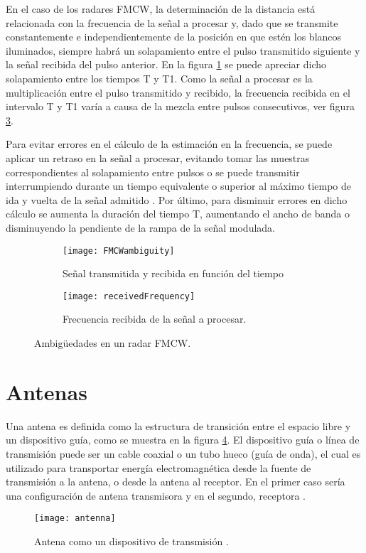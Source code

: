 En el caso de los radares FMCW, la determinación de la distancia está relacionada con la frecuencia de la señal a procesar y, dado que se transmite constantemente e independientemente de la posición en que estén los blancos iluminados, siempre habrá un solapamiento entre el pulso transmitido siguiente y la señal recibida del pulso anterior. En la figura \ref{fig:fmcwAmbiguity} se puede apreciar dicho solapamiento entre los tiempos T y T1. Como la señal a procesar es la multiplicación entre el pulso transmitido y recibido, la frecuencia recibida en el intervalo T y T1 varía a causa de la mezcla entre pulsos consecutivos, ver figura \ref{fig:modulationDelayed}.

Para evitar errores en el cálculo de la estimación en la frecuencia, se puede aplicar un retraso en la señal a procesar, evitando tomar las muestras correspondientes al solapamiento entre pulsos o se puede transmitir interrumpiendo durante un tiempo equivalente o superior al máximo tiempo de ida y vuelta de la señal admitido \cite{Varavin2007a}. Por último, para disminuir errores en dicho cálculo se aumenta la duración del tiempo T, aumentando el ancho de banda o disminuyendo la pendiente de la rampa de la señal modulada.

\begin{figure}[H]
  \centering
  \begin{subfigure}[t]{0.49\textwidth}
    \texttt{[image: FMCWambiguity]}
    \caption{Señal transmitida y recibida en función del tiempo}
    \label{fig:fmcwAmbiguity}   
  \end{subfigure}
  \begin{subfigure}[t]{0.49\textwidth}
    \texttt{[image: receivedFrequency]}
    \caption{Frecuencia recibida de la señal a procesar.}
    \label{fig:modulationDelayed}
  \end{subfigure}             
  \caption{Ambigüedades en un radar FMCW.}
\end{figure}

\section{Antenas}

Una antena es definida como la estructura de transición entre el espacio libre y un dispositivo guía, como se muestra en la 
figura \ref{fig:antenna}. El dispositivo guía o línea de transmisión puede ser un cable coaxial o un tubo hueco (guía de 
onda), el cual es utilizado para transportar energía electromagnética desde la fuente de transmisión a la antena, o desde la 
antena al receptor. En el primer caso sería una configuración de antena transmisora y en el segundo, receptora \cite{Balanis2012}.
\begin{figure}[H]
 \centering
 \texttt{[image: antenna]}
 \caption{Antena como un dispositivo de transmisión \cite{Balanis2012}.}
 \label{fig:antenna}
\end{figure}


